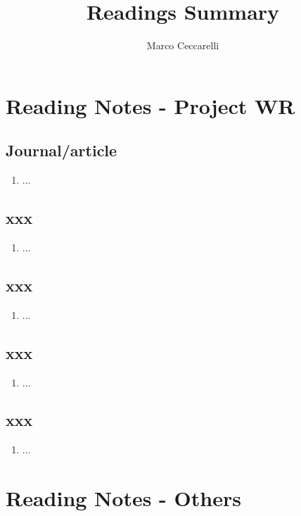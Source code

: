 \documentclass[11pt,a4paper,paranthesis]{article}
\author{Marco Ceccarelli}
\title{ \large Readings Summary}
\begin{document}
	\maketitle
	\tableofcontents

\section{Reading Notes - Project WR}

\subsection{Journal/article}
\begin{enumerate}
	\item ...
\end{enumerate}

\subsection{xxx}
\begin{enumerate}
	\item ...
\end{enumerate}

\subsection{xxx}
\begin{enumerate}
	\item ...
\end{enumerate}

\subsection{xxx}
\begin{enumerate}
	\item ...
\end{enumerate}

\subsection{xxx}
\begin{enumerate}
	\item ...
\end{enumerate}

\section{Reading Notes - Others}
\end{document}
